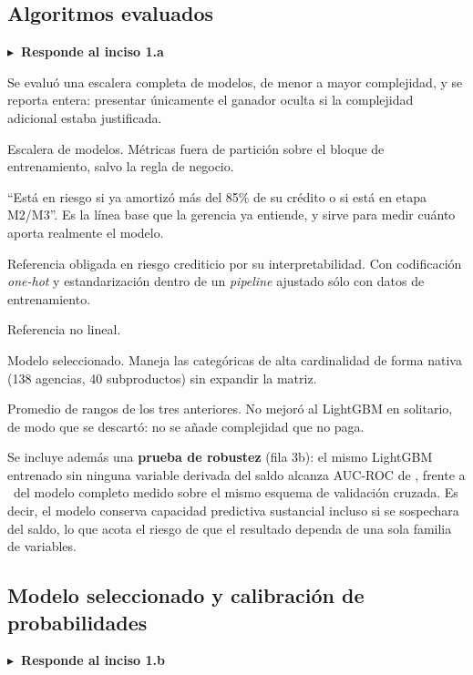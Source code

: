 \documentclass[11pt,a4paper]{article}
\newcommand{\inciso}[1]{%
  \vspace{0.2em}\noindent\textcolor{gacento}{\sffamily\bfseries\small
  $\blacktriangleright$~Responde al inciso #1}\vspace{0.3em}\par}
\newcommand{\T}[1]{}
\begin{document}
\subsection{Algoritmos evaluados}
\label{sec:algoritmos}
\inciso{1.a}

Se evaluó una escalera completa de modelos, de menor a mayor complejidad, y se
reporta entera: presentar únicamente el ganador oculta si la complejidad
adicional estaba justificada.

\begin{table}[H]\centering\small
\caption{Escalera de modelos. Métricas fuera de partición sobre el bloque de
entrenamiento, salvo la regla de negocio.}
\label{tab:escalera}
\T{escalera}
\end{table}

\begin{description}[leftmargin=1.4em,style=nextline,nosep]
\item[Nivel 0 --- Regla de negocio] ``Está en riesgo si ya amortizó más del 85\%
      de su crédito o si está en etapa M2/M3''. Es la línea base que la gerencia
      ya entiende, y sirve para medir cuánto aporta realmente el modelo.
\item[Nivel 1 --- Regresión logística] Referencia obligada en riesgo crediticio
      por su interpretabilidad. Con codificación \emph{one-hot} y estandarización
      dentro de un \emph{pipeline} ajustado sólo con datos de entrenamiento.
\item[Nivel 2 --- Random Forest] Referencia no lineal.
\item[Nivel 3 --- LightGBM] Modelo seleccionado. Maneja las categóricas de alta
      cardinalidad de forma nativa (138 agencias, 40 subproductos) sin expandir la
      matriz.
\item[Nivel 4 --- Ensamble] Promedio de rangos de los tres anteriores. No mejoró
      al LightGBM en solitario, de modo que se descartó: no se añade complejidad
      que no paga.
\end{description}

\noindent Se incluye además una \textbf{prueba de robustez} (fila 3b): el mismo
LightGBM entrenado sin ninguna variable derivada del saldo alcanza AUC-ROC de
\AUCSinSaldo, frente a \AUCROCcv\ del modelo completo medido sobre el mismo
esquema de validación cruzada. Es decir, el modelo conserva capacidad predictiva
sustancial incluso si se sospechara del saldo, lo que acota el riesgo de que el
resultado dependa de una sola familia de variables.

\subsection{Modelo seleccionado y calibración de probabilidades}
\label{sec:calibracion}
\inciso{1.b}
\end{document}
